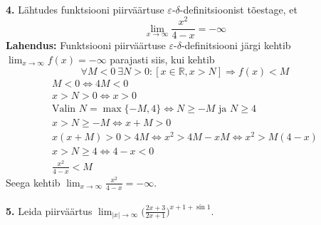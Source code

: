 \documentclass{article}
\begin{document}
\pagebreak\\
\textbf{4.} L\"ahtudes funktsiooni piirv\"a\"artuse $\varepsilon$-$\delta$-definitsioonist t\~oestage, et
\begin{equation*}
\lim_{x\to\infty} \frac{x^2}{4-x}=-\infty
\end{equation*}
\textbf{Lahendus:} Funktsiooni piirv\"a\"artuse $\varepsilon$-$\delta$-definitsiooni j\"argi kehtib $\displaystyle\lim_{x\to\infty} f(x)=-\infty$ parajasti siis, kui kehtib
\begin{equation*}
\forall M<0\ \exists N>0:[x\in \mathbb{R}, x>N]\Rightarrow f(x)<M
\end{equation*}
\begin{gather*}
M<0\Leftrightarrow 4M<0\\
x>N>0\Leftrightarrow x>0\\
\text{Valin } N=\max\{-M,4\}\Leftrightarrow N\geq-M \text{ ja }N\geq 4\\
x>N\geq-M\Leftrightarrow x+M>0\\
x(x+M)>0>4M \Leftrightarrow x^2>4M-xM\Leftrightarrow x^2>M(4-x)\\
x>N\geq4\Leftrightarrow 4-x<0\\
\frac{x^2}{4-x}<M
\end{gather*}
Seega kehtib $\displaystyle\lim_{x\to\infty} \frac{x^2}{4-x}=-\infty$.\\\pagebreak\\
\textbf{5.} Leida piirv\"a\"artus $\displaystyle\lim_{|x|\to\infty} \bigg( \frac{2x+3}{2x+1}\bigg)^{x+1+\sin 1}$.\\
\end{document}
